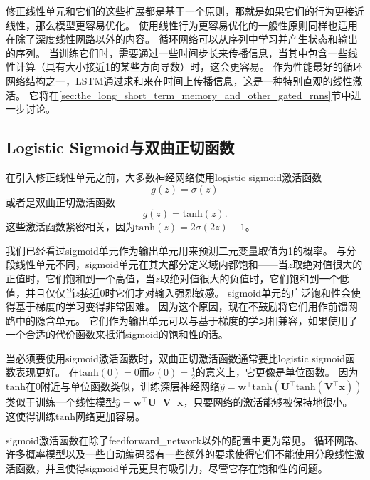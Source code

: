 修正线性单元和它们的这些扩展都是基于一个原则，那就是如果它们的行为更接近线性，那么模型更容易优化。
使用线性行为更容易优化的一般性原则同样也适用在除了深度线性网路以外的内容。
循环网络可以从序列中学习并产生状态和输出的序列。
当训练它们时，需要通过一些时间步长来传播信息，当其中包含一些线性计算（具有大小接近1的某些方向导数）时，这会更容易。
作为性能最好的循环网络结构之一，LSTM通过求和来在时间上传播信息，这是一种特别直观的线性激活。
它将在\ref{sec:the_long_short_term_memory_and_other_gated_rnns}节中进一步讨论。


\subsection{Logistic Sigmoid与双曲正切函数}
\label{sec:logistic_sigmoid_and_hyperbolic_tangent}

在引入修正线性单元之前，大多数神经网络使用logistic sigmoid激活函数
\begin{equation}
g(z) = \sigma(z)
\end{equation}
或者是双曲正切激活函数
\begin{equation}
g(z) = \text{tanh}(z).
\end{equation}
这些激活函数紧密相关，因为$\text{tanh}(z)=2\sigma(2z)-1$。

我们已经看过sigmoid单元作为输出单元用来预测二元变量取值为1的概率。
与分段线性单元不同，sigmoid单元在其大部分定义域内都饱和——当$z$取绝对值很大的正值时，它们饱和到一个高值，当$z$取绝对值很大的负值时，它们饱和到一个低值，并且仅仅当$z$接近0时它们才对输入强烈敏感。
sigmoid单元的广泛饱和性会使得基于梯度的学习变得非常困难。
因为这个原因，现在不鼓励将它们用作前馈网路中的隐含单元。
它们作为输出单元可以与基于梯度的学习相兼容，如果使用了一个合适的代价函数来抵消sigmoid的饱和性的话。

当必须要使用sigmoid激活函数时，双曲正切激活函数通常要比logistic sigmoid函数表现更好。
在$\text{tanh}(0)=0$而$\sigma(0)=\frac{1}{2}$的意义上，它更像是单位函数。
因为$\text{tanh}$在0附近与单位函数类似，训练深层神经网络$\hat{y}=\bm{w}^\top \text{tanh}(\bm{U}^\top \text{tanh}(\bm{V}^\top \bm{x}))$类似于训练一个线性模型$\hat{y}= \bm{w}^\top \bm{U}^\top \bm{V}^\top \bm{x}$，只要网络的激活能够被保持地很小。
这使得训练$\text{tanh}$网络更加容易。


sigmoid激活函数在除了\gls{feedforward_network}以外的配置中更为常见。
循环网路、许多概率模型以及一些自动编码器有一些额外的要求使得它们不能使用分段线性激活函数，并且使得sigmoid单元更具有吸引力，尽管它存在饱和性的问题。

